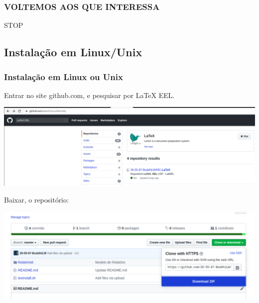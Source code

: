 \documentclass{beamer}
\begin{document}
\begin{frame}
  \begin{center}
    \frametitle{VOLTEMOS AOS QUE INTERESSA}
    \begin{tcolorbox}[
      size=minimal,
      width=4.2cm,octogon arc,
      colback=red,colframe=white,colupper=white,
      fontupper=\fontsize{14mm}{14mm}\selectfont\bfseries\sffamily,
      auto outer arc,
      halign=center,valign=center,
      square, arc is angular,
      borderline={0.4mm}{-2mm}{red}]
      STOP
    \end{tcolorbox}

  \end{center}
\end{frame}

\begin{frame}
  \section{Instalação em Linux/Unix}
  \frametitle{Instalação em Linux ou Unix}

  \begin{tcolorbox}[width=10cm, height=6.7mm, top=0.2mm, sharp corners]
    Entrar no site github.com, e pesquisar por LaTeX EEL.
  \end{tcolorbox}

  \includegraphics[scale=0.2]{../Imagens/MC1.png}

  \pause

  \begin{tcolorbox}[width=4.5cm, height=6.7mm, top=0.2mm, sharp corners=downhill ]
    Baixar, o repositório:
  \end{tcolorbox}
  \includegraphics[scale=0.2]{../Imagens/MC3.png}

\end{frame}
\end{document}
